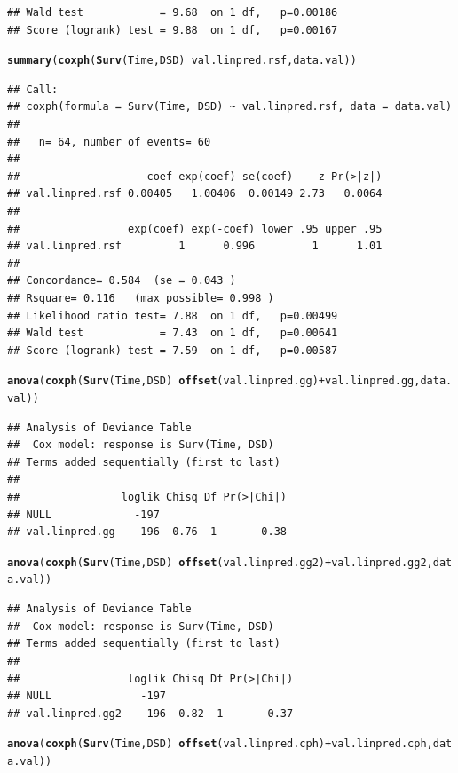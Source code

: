 \documentclass{article}\usepackage[]{graphicx}\usepackage[]{color}
\makeatletter
\newcommand{\hlopt}[1]{\textcolor[rgb]{0,0,0}{#1}}%
\newcommand{\hlstd}[1]{\textcolor[rgb]{0.345,0.345,0.345}{#1}}%
\newcommand{\hlkwd}[1]{\textcolor[rgb]{0.737,0.353,0.396}{\textbf{#1}}}%
\newenvironment{kframe}{%
 \def\at@end@of@kframe{}%
 \ifinner\ifhmode%
  \def\at@end@of@kframe{\end{minipage}}%
  \begin{minipage}{\columnwidth}%
 \fi\fi%
 \def\FrameCommand##1{\hskip\@totalleftmargin \hskip-\fboxsep
 \colorbox{shadecolor}{##1}\hskip-\fboxsep
     \hskip-\linewidth \hskip-\@totalleftmargin \hskip\columnwidth}%
 \MakeFramed {\advance\hsize-\width
   \@totalleftmargin\z@ \linewidth\hsize
   \@setminipage}}%
 {\par\unskip\endMakeFramed%
 \at@end@of@kframe}
\newenvironment{knitrout}{}{} %
\makeatother
\begin{document}
\begin{knitrout}
\begin{kframe}
\begin{verbatim}
## Wald test            = 9.68  on 1 df,   p=0.00186
## Score (logrank) test = 9.88  on 1 df,   p=0.00167
\end{verbatim}
\begin{alltt}
\hlkwd{summary}\hlstd{(}\hlkwd{coxph}\hlstd{(}\hlkwd{Surv}\hlstd{(Time, DSD)} \hlopt{~} \hlstd{val.linpred.rsf, data.val))}
\end{alltt}
\begin{verbatim}
## Call:
## coxph(formula = Surv(Time, DSD) ~ val.linpred.rsf, data = data.val)
## 
##   n= 64, number of events= 60 
## 
##                    coef exp(coef) se(coef)    z Pr(>|z|)
## val.linpred.rsf 0.00405   1.00406  0.00149 2.73   0.0064
## 
##                 exp(coef) exp(-coef) lower .95 upper .95
## val.linpred.rsf         1      0.996         1      1.01
## 
## Concordance= 0.584  (se = 0.043 )
## Rsquare= 0.116   (max possible= 0.998 )
## Likelihood ratio test= 7.88  on 1 df,   p=0.00499
## Wald test            = 7.43  on 1 df,   p=0.00641
## Score (logrank) test = 7.59  on 1 df,   p=0.00587
\end{verbatim}
\begin{alltt}
\hlkwd{anova}\hlstd{(}\hlkwd{coxph}\hlstd{(}\hlkwd{Surv}\hlstd{(Time, DSD)} \hlopt{~} \hlkwd{offset}\hlstd{(val.linpred.gg)} \hlopt{+} \hlstd{val.linpred.gg, data.val))}
\end{alltt}
\begin{verbatim}
## Analysis of Deviance Table
##  Cox model: response is Surv(Time, DSD)
## Terms added sequentially (first to last)
## 
##                loglik Chisq Df Pr(>|Chi|)
## NULL             -197                    
## val.linpred.gg   -196  0.76  1       0.38
\end{verbatim}
\begin{alltt}
\hlkwd{anova}\hlstd{(}\hlkwd{coxph}\hlstd{(}\hlkwd{Surv}\hlstd{(Time, DSD)} \hlopt{~} \hlkwd{offset}\hlstd{(val.linpred.gg2)} \hlopt{+} \hlstd{val.linpred.gg2, data.val))}
\end{alltt}
\begin{verbatim}
## Analysis of Deviance Table
##  Cox model: response is Surv(Time, DSD)
## Terms added sequentially (first to last)
## 
##                 loglik Chisq Df Pr(>|Chi|)
## NULL              -197                    
## val.linpred.gg2   -196  0.82  1       0.37
\end{verbatim}
\begin{alltt}
\hlkwd{anova}\hlstd{(}\hlkwd{coxph}\hlstd{(}\hlkwd{Surv}\hlstd{(Time, DSD)} \hlopt{~} \hlkwd{offset}\hlstd{(val.linpred.cph)} \hlopt{+} \hlstd{val.linpred.cph, data.val))}

\end{alltt}
\end{kframe}
\end{knitrout}
\end{document}
